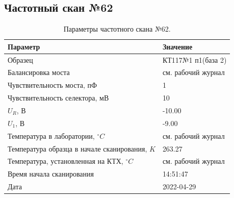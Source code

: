 \subsection{Частотный скан №62}
\begin{table}[!ht]
    \centering
    \caption{Параметры частотного скана №62.}
    \begin{tabular}{|l|l|}
        \hline
        Параметр                                       & Значение                  \\ \hline
        Образец                                        & КТ117№1 п1(база 2)        \\ \hline
        Балансировка моста                             & см. рабочий журнал        \\ \hline
        Чувствительность моста, пФ                     & 1                         \\ \hline
        Чувствительность селектора, мВ                 & 10                        \\ \hline
        $U_R$, В                                       & -10.00                    \\ \hline
        $U_1$, В                                       & -9.00                     \\ \hline
        Температура в лаборатории, $^\circ C$          & см. рабочий журнал        \\ \hline
        Температура образца в начале сканирования, $K$ & 263.27                    \\ \hline
        Температура, установленная на КТХ, $^\circ C$  & см. рабочий журнал        \\ \hline
        Время начала сканирования                      & 14:51:47                  \\ \hline
        Дата                                           & 2022-04-29                \\ \hline
    \end{tabular}
    \label{table:frequency_scan_62}
\end{table}

